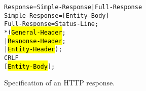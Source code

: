 \begin{figure}[ht]
		\begin{alltt}
			\hspace{1in} Response        = Simple-Response | Full-Response
			\hspace{1in} Simple-Response = [ Entity- Body ]
			\hspace{1in} Full-Response   = Status-Line                ;
			\hspace{1in}                   *( \hl{General-Header}         ;
			\hspace{1in}                    | \hl{Response-Header}        ;
			\hspace{1in}                    | \hl{Entity-Header} )        ;
			\hspace{1in}                   CRLF
			\hspace{1in}                    [ \hl{Entity-Body} ]          ;
		\end{alltt}		
\caption{Specification of an HTTP response.}	
\label{fig:HTTP_response}
\end{figure}